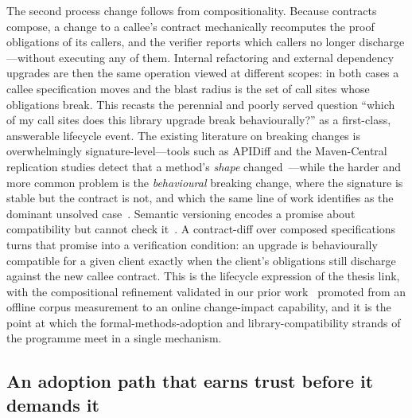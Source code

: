 The second process change follows from compositionality. Because contracts
compose, a change to a callee's contract mechanically recomputes the proof
obligations of its callers, and the verifier reports which callers no longer
discharge---without executing any of them. Internal refactoring and external
dependency upgrades are then the same operation viewed at different scopes: in
both cases a callee specification moves and the blast radius is the set of call
sites whose obligations break. This recasts the perennial and poorly served
question ``which of my call sites does this library upgrade break
behaviourally?'' as a first-class, answerable lifecycle event. The existing
literature on breaking changes is overwhelmingly signature-level---tools such as
APIDiff and the Maven-Central replication studies detect that a method's
\emph{shape} changed~\cite{brito2018apidiff,ochoa2022breaking}---while the harder
and more common problem is the \emph{behavioural} breaking change, where the
signature is stable but the contract is not, and which the same line of work
identifies as the dominant unsolved
case~\cite{mostafa2017behavioral,jayasuriya2024understanding}. Semantic
versioning encodes a promise about compatibility but cannot check
it~\cite{preston2013semver,raemaekers2017semver}. A contract-diff over composed
specifications turns that promise into a verification condition: an upgrade is
behaviourally compatible for a given client exactly when the client's obligations
still discharge against the new callee contract. This is the lifecycle
expression of the thesis link, with the compositional refinement validated in
our prior work~\cite{edmonds_article3} promoted from an offline corpus
measurement to an online change-impact capability, and it is the point at which
the formal-methods-adoption and library-compatibility strands of the programme
meet in a single mechanism.

\subsection{An adoption path that earns trust before it demands it}\label{subsec:disc-adoption}

